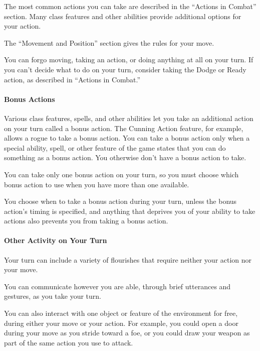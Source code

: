 \documentclass[
]{article}
\begin{document}
The most common actions you can take are described in the ``Actions in
Combat'' section. Many class features and other abilities provide
additional options for your action.

The ``Movement and Position'' section gives the rules for your move.

You can forgo moving, taking an action, or doing anything at all on your
turn. If you can't decide what to do on your turn, consider taking the
Dodge or Ready action, as described in ``Actions in Combat.''

\hypertarget{bonus-actions}{%
\paragraph{Bonus Actions}\label{bonus-actions}}

Various class features, spells, and other abilities let you take an
additional action on your turn called a bonus action. The Cunning Action
feature, for example, allows a rogue to take a bonus action. You can
take a bonus action only when a special ability, spell, or other feature
of the game states that you can do something as a bonus action. You
otherwise don't have a bonus action to take.

You can take only one bonus action on your turn, so you must choose
which bonus action to use when you have more than one available.

You choose when to take a bonus action during your turn, unless the
bonus action's timing is specified, and anything that deprives you of
your ability to take actions also prevents you from taking a bonus
action.

\hypertarget{other-activity-on-your-turn}{%
\paragraph{Other Activity on Your
Turn}\label{other-activity-on-your-turn}}

Your turn can include a variety of flourishes that require neither your
action nor your move.

You can communicate however you are able, through brief utterances and
gestures, as you take your turn.

You can also interact with one object or feature of the environment for
free, during either your move or your action. For example, you could
open a door during your move as you stride toward a foe, or you could
draw your weapon as part of the same action you use to attack.
\end{document}
